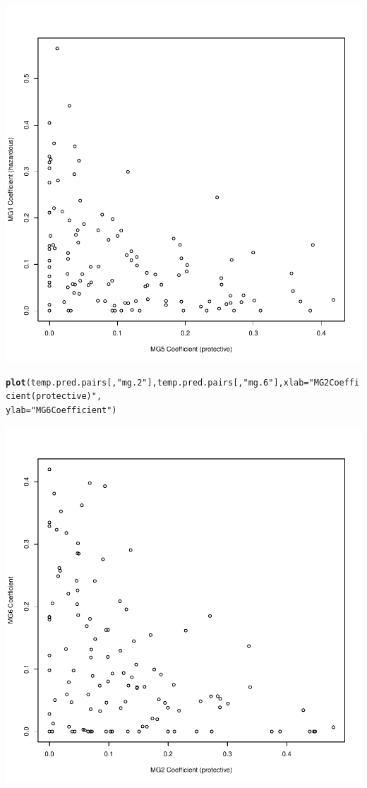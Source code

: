 \documentclass{article}\usepackage[]{graphicx}\usepackage[]{color}
\makeatletter
\def\maxwidth{ %
  \ifdim\Gin@nat@width>\linewidth
    \linewidth
  \else
    \Gin@nat@width
  \fi
}
\newcommand{\hlstr}[1]{\textcolor[rgb]{0.192,0.494,0.8}{#1}}%
\newcommand{\hlstd}[1]{\textcolor[rgb]{0.345,0.345,0.345}{#1}}%
\newcommand{\hlkwc}[1]{\textcolor[rgb]{0.333,0.667,0.333}{#1}}%
\newcommand{\hlkwd}[1]{\textcolor[rgb]{0.737,0.353,0.396}{\textbf{#1}}}%
\newenvironment{kframe}{%
 \def\at@end@of@kframe{}%
 \ifinner\ifhmode%
  \def\at@end@of@kframe{\end{minipage}}%
  \begin{minipage}{\columnwidth}%
 \fi\fi%
 \def\FrameCommand##1{\hskip\@totalleftmargin \hskip-\fboxsep
 \colorbox{shadecolor}{##1}\hskip-\fboxsep
     \hskip-\linewidth \hskip-\@totalleftmargin \hskip\columnwidth}%
 \MakeFramed {\advance\hsize-\width
   \@totalleftmargin\z@ \linewidth\hsize
   \@setminipage}}%
 {\par\unskip\endMakeFramed%
 \at@end@of@kframe}
\newenvironment{knitrout}{}{} %
\makeatother
\begin{document}
\begin{knitrout}
{\centering \includegraphics[width=\maxwidth]{figure/metagene-pairs-8} 

}


\begin{kframe}\begin{alltt}
\hlkwd{plot}\hlstd{(temp.pred.pairs[,} \hlstr{"mg.2"}\hlstd{], temp.pred.pairs[,} \hlstr{"mg.6"}\hlstd{],} \hlkwc{xlab} \hlstd{=} \hlstr{"MG2 Coefficient (protective)"}\hlstd{,}
    \hlkwc{ylab} \hlstd{=} \hlstr{"MG6 Coefficient"}\hlstd{)}
\end{alltt}
\end{kframe}

{\centering \includegraphics[width=\maxwidth]{figure/metagene-pairs-9} 

}
\end{knitrout}
\end{document}
